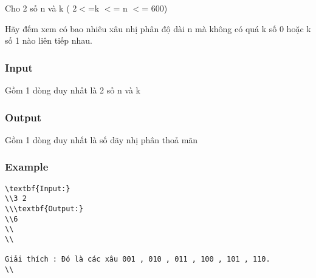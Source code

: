 



   Cho 2 số n và k ( 2$<$=k $<$= n $<$= 600)  

   Hãy đếm xem có bao nhiêu xâu nhị phân độ dài n mà không có quá k số 0 hoặc k số 1 nào liên tiếp nhau.  

\subsubsection{   Input  }

   Gồm 1 dòng duy nhất là 2 số n và k  

\subsubsection{   Output  }

   Gồm 1 dòng duy nhất là số dãy nhị phân thoả mãn  

\subsubsection{   Example  }
\begin{verbatim}
\textbf{Input:}
\\3 2
\\\textbf{Output:}
\\6
\\
\\

Giải thích : Đó là các xâu 001 , 010 , 011 , 100 , 101 , 110.
\\\end{verbatim}